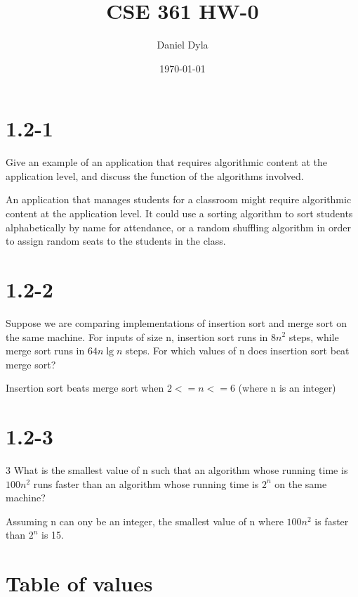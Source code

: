 \documentclass[11pt]{article}
\author{Daniel Dyla}
\date{\today}
\title{CSE 361 HW-0}
\begin{document}
\maketitle

\section{1.2-1}
\label{sec-1}

Give an example of an application that requires algorithmic content at
the application level, and discuss the function of the algorithms
involved.


An application that manages students for a classroom might require
algorithmic content at the application level. It could use a sorting
algorithm to sort students alphabetically by name for attendance, or a
random shuffling algorithm in order to assign random seats to the
students in the class.

\section{1.2-2}
\label{sec-2}

Suppose we are comparing implementations of insertion sort and merge
sort on the same machine. For inputs of size n, insertion sort runs in
$8n^2$ steps, while merge sort runs in $64 n \lg n$ steps. For which
values of n does insertion sort beat merge sort?


Insertion sort beats merge sort when $2 <= n <= 6$ (where n is an
integer)

\section{1.2-3}
\label{sec-3}

3 What is the smallest value of n such that an algorithm whose running
time is $100n^2$ runs faster than an algorithm whose running time is
$2^n$ on the same machine?


Assuming n can ony be an integer, the smallest value of n where
$100n^2$ is faster than $2^n$ is 15.

\section{Table of values}
\label{sec-4}
\end{document}
